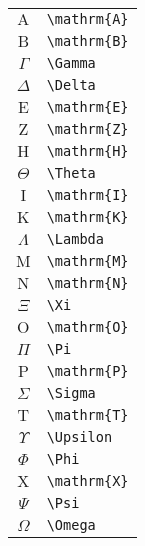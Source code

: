 \begin{table}[h]
\begin{minipage}[t]{0.28\textwidth}
\begin{tabular}{c l}
			\hline
		\end{tabular}
	\end{minipage}
	\qquad
	\begin{minipage}[t]{0.28\textwidth}
		\centering
		\begin{tabular}{c l}
			\hline
			$\mathrm{A}$  & \verb|\mathrm{A}|                \\
			$\mathrm{B}$  & \verb|\mathrm{B}|                \\
			$\Gamma$      & \verb|\Gamma|                    \\
			$\Delta$      & \verb|\Delta|                    \\
			$\mathrm{E}$  & \verb|\mathrm{E}|                \\
			$\mathrm{Z}$  & \verb|\mathrm{Z}|                \\
			$\mathrm{H}$  & \verb|\mathrm{H}|                \\
			$\Theta$      & \verb|\Theta|                    \\
			$\mathrm{I}$  & \verb|\mathrm{I}|                \\
			$\mathrm{K}$  & \verb|\mathrm{K}|                \\
			$\Lambda$     & \verb|\Lambda|                   \\
			$\mathrm{M}$  & \verb|\mathrm{M}|                \\
			$\mathrm{N}$  & \verb|\mathrm{N}|                \\
			$\Xi$         & \verb|\Xi|                       \\
			$\mathrm{O}$  & \verb|\mathrm{O}|                \\
			$\Pi$         & \verb|\Pi|                       \\
			$\mathrm{P}$  & \verb|\mathrm{P}|                \\
			$\Sigma$      & \verb|\Sigma|                    \\
			$\mathrm{T}$  & \verb|\mathrm{T}|                \\
			$\Upsilon$    & \verb|\Upsilon|                  \\
			$\Phi$        & \verb|\Phi|                      \\
			$\mathrm{X}$  & \verb|\mathrm{X}|                \\
			$\Psi$        & \verb|\Psi|                      \\
			$\Omega$      & \verb|\Omega|                    \\
			\hline
		\end{tabular}

\end{minipage}
\end{table}
